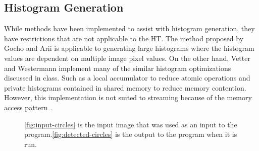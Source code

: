 \documentclass[12pt]{article}
\begin{document}
\subsection*{Histogram Generation}
\label{subsec:histogramGeneration}
\noindent
While methods have been implemented to assist with histogram generation, they have restrictions that are not applicable to the HT. 
The method proposed by Gocho and Arii\cite{9324376} is applicable to generating large histograms where the histogram values are dependent on multiple image pixel values.
On the other hand, Vetter and Westermann implement many of the similar histogram optimizations discussed in class.
Such as a local accumulator to reduce atomic operations and private histograms contained in shared memory to reduce memory contention. 
However, this implementation is not suited to streaming because of the memory access pattern \cite{5872623}. 

\begin{figure}
  \centering
  \hfil
  \caption{\ref{fig:input-circles} is the input image that was used as an input to the program.\ref{fig:detected-circles} is the output to the program when it is run.}
\end{figure}
\end{document}
